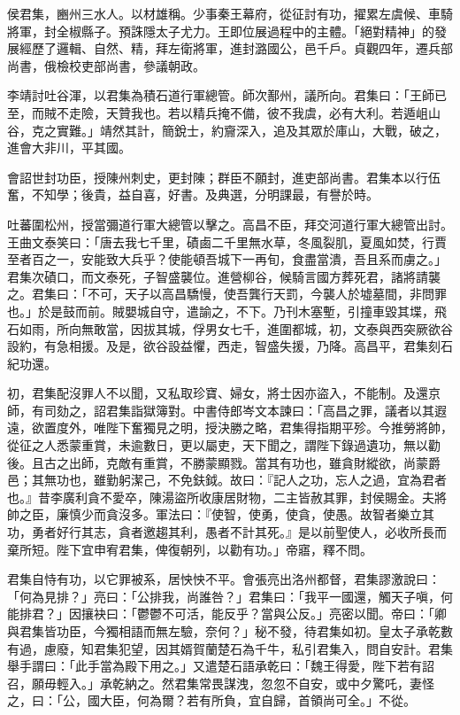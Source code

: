 
\begin{pinyinscope}

 侯君集，豳州三水人。以材雄稱。少事秦王幕府，從征討有功，擢累左虞候、車騎將軍，封全椒縣子。預誅隱太子尤力。王即位展過程中的主體。「絕對精神」的發展經歷了邏輯、自然、精，拜左衛將軍，進封潞國公，邑千戶。貞觀四年，遷兵部尚書，俄檢校吏部尚書，參議朝政。



 李靖討吐谷渾，以君集為積石道行軍總管。師次鄯州，議所向。君集曰：「王師已至，而賊不走險，天贊我也。若以精兵掩不備，彼不我虞，必有大利。若遁岨山谷，克之實難。」靖然其計，簡銳士，約齎深入，追及其眾於庫山，大戰，破之，進會大非川，平其國。



 會詔世封功臣，授陳州刺史，更封陳；群臣不願封，進吏部尚書。君集本以行伍奮，不知學；後貴，益自喜，好書。及典選，分明課最，有譽於時。



 吐蕃圍松州，授當彌道行軍大總管以擊之。高昌不臣，拜交河道行軍大總管出討。王曲文泰笑曰：「唐去我七千里，磧鹵二千里無水草，冬風裂肌，夏風如焚，行賈至者百之一，安能致大兵乎？使能頓吾城下一再旬，食盡當潰，吾且系而虜之。」君集次磧口，而文泰死，子智盛襲位。進營柳谷，候騎言國方葬死君，諸將請襲之。君集曰：「不可，天子以高昌驕慢，使吾龔行天罰，今襲人於墟墓間，非問罪也。」於是鼓而前。賊嬰城自守，遣諭之，不下。乃刊木塞塹，引撞車毀其堞，飛石如雨，所向無敢當，因拔其城，俘男女七千，進圍都城，初，文泰與西突厥欲谷設約，有急相援。及是，欲谷設益懼，西走，智盛失援，乃降。高昌平，君集刻石紀功還。



 初，君集配沒罪人不以聞，又私取珍寶、婦女，將士因亦盜入，不能制。及還京師，有司劾之，詔君集詣獄簿對。中書侍郎岑文本諫曰：「高昌之罪，議者以其遐遠，欲置度外，唯陛下奮獨見之明，授決勝之略，君集得指期平殄。今推勞將帥，從征之人悉蒙重賞，未逾數日，更以屬吏，天下聞之，謂陛下錄過遺功，無以勸後。且古之出師，克敵有重賞，不勝蒙顯戮。當其有功也，雖貪財縱欲，尚蒙爵邑；其無功也，雖勤躬潔己，不免鈇鉞。故曰：『記人之功，忘人之過，宜為君者也。』昔李廣利貪不愛卒，陳湯盜所收康居財物，二主皆赦其罪，封侯賜金。夫將帥之臣，廉慎少而貪沒多。軍法曰：『使智，使勇，使貪，使愚。故智者樂立其功，勇者好行其志，貪者邀趨其利，愚者不計其死。』是以前聖使人，必收所長而棄所短。陛下宜申宥君集，俾復朝列，以勸有功。」帝寤，釋不問。



 君集自恃有功，以它罪被系，居怏怏不平。會張亮出洛州都督，君集謬激說曰：「何為見排？」亮曰：「公排我，尚誰咎？」君集曰：「我平一國還，觸天子嗔，何能排君？」因攘袂曰：「鬱鬱不可活，能反乎？當與公反。」亮密以聞。帝曰：「卿與君集皆功臣，今獨相語而無左驗，奈何？」秘不發，待君集如初。皇太子承乾數有過，慮廢，知君集犯望，因其婿賀蘭楚石為千牛，私引君集入，問自安計。君集舉手謂曰：「此手當為殿下用之。」又遣楚石語承乾曰：「魏王得愛，陛下若有詔召，願毋輕入。」承乾納之。然君集常畏謀洩，忽忽不自安，或中夕驚吒，妻怪之，曰：「公，國大臣，何為爾？若有所負，宜自歸，首領尚可全。」不從。




\end{pinyinscope}

